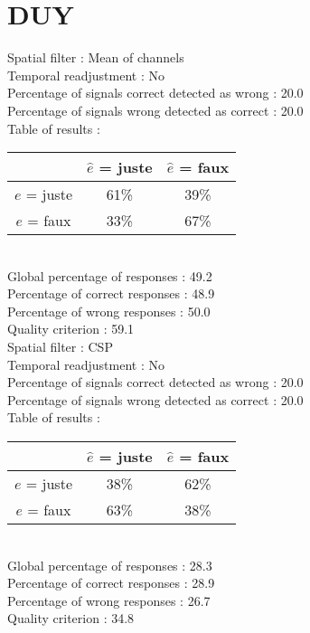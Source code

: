 \section*{DUY}
Spatial filter : Mean of channels \\
Temporal readjustment : No \\
Percentage of signals correct detected as wrong :   20.0 \\
Percentage of signals wrong detected as correct :   20.0 \\
Table of results : \\
\begin{tabular}{|c|c|c|}
\hline				& $\hat{e}$ = juste & $\hat{e}$ = faux \\
\hline  $e$ = juste	&     61\%			&     39\%		\\
\hline  $e$ = faux	&     33\%			&     67\%		\\
\hline
\end{tabular}\\
Global percentage of responses :   49.2 \\
Percentage of correct responses :   48.9 \\
Percentage of wrong responses :   50.0 \\
Quality criterion :   59.1 \\

Spatial filter : CSP \\
Temporal readjustment : No \\
Percentage of signals correct detected as wrong :   20.0 \\
Percentage of signals wrong detected as correct :   20.0 \\
Table of results : \\
\begin{tabular}{|c|c|c|}
\hline				& $\hat{e}$ = juste & $\hat{e}$ = faux \\
\hline  $e$ = juste	&     38\%			&     62\%		\\
\hline  $e$ = faux	&     63\%			&     38\%		\\
\hline
\end{tabular}\\
Global percentage of responses :   28.3 \\
Percentage of correct responses :   28.9 \\
Percentage of wrong responses :   26.7 \\
Quality criterion :   34.8 \\


